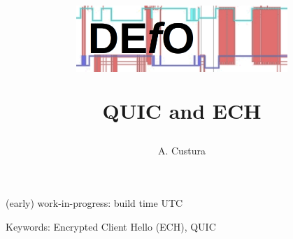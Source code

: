 \documentclass[a4paper]{article}
\begin{document}

\title{
    \begin{center}
\includegraphics[width=0.6\textwidth]{defologo.png}
    \end{center}
    QUIC and ECH
}

\author{
    A. Custura
}





\maketitle
\begin{center}
\small
(early) work-in-progress: build time {\currenttime} UTC\\
\normalsize
\end{center}



\clearpage
\small
\tableofcontents
\normalsize

Keywords: Encrypted Client Hello (ECH), QUIC












\appendices

\end{document}
